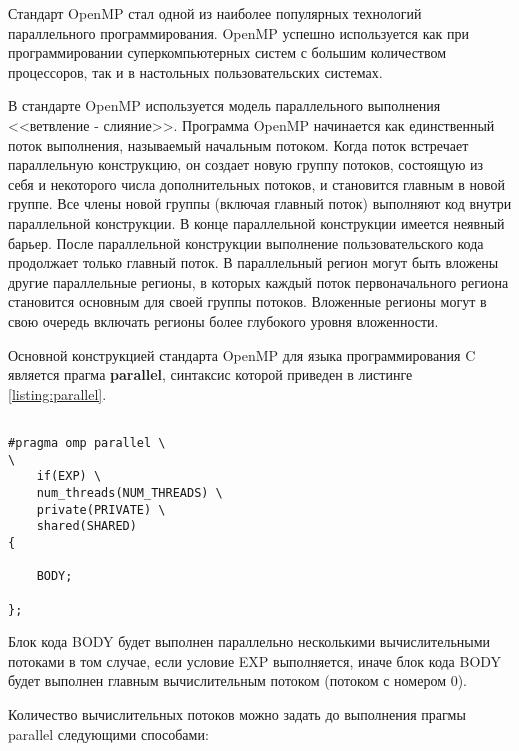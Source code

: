Стандарт OpenMP стал одной из наиболее популярных технологий параллельного программирования. OpenMP успешно используется как при программировании суперкомпьютерных систем с большим количеством процессоров, так и в настольных пользовательских системах.

В стандарте OpenMP используется модель параллельного выполнения <<ветвление - слияние>>. Программа OpenMP начинается как единственный поток выполнения, называемый начальным потоком. Когда поток встречает параллельную конструкцию, он создает новую группу потоков, состоящую из себя и некоторого числа дополнительных потоков, и становится главным в новой группе. Все члены новой группы (включая главный поток) выполняют код внутри параллельной конструкции. В конце параллельной конструкции имеется неявный барьер. После параллельной конструкции выполнение пользовательского кода продолжает только главный поток. В параллельный регион могут быть вложены другие параллельные регионы, в которых каждый поток первоначального региона становится основным для своей группы потоков. Вложенные регионы могут в свою очередь включать регионы более глубокого уровня вложенности.

Основной конструкцией стандарта OpenMP для языка программирования C является прагма {\bf parallel}, синтаксис которой приведен в листинге \ref{listing:parallel}.

\begin{lstlisting}

#pragma omp parallel \
\
	if(EXP) \
	num_threads(NUM_THREADS) \
	private(PRIVATE) \
	shared(SHARED)
{

	BODY;

};

\end{lstlisting}
\mylistingend

Блок кода BODY будет выполнен параллельно несколькими вычислительными потоками в том случае, если условие EXP выполняется, иначе блок кода BODY будет выполнен главным вычислительным потоком (потоком с номером 0).

Количество вычислительных потоков можно задать до выполнения прагмы parallel следующими способами:

